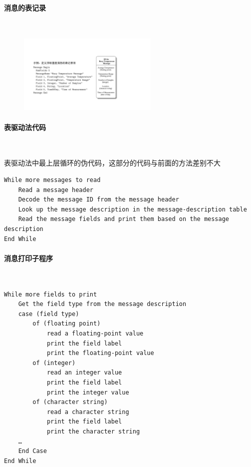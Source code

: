 \paragraph*{消息的表记录}~{} \par
\begin{figure}[H]
    \vspace{-0.5em}
	\centering
	\includegraphics[width=0.6\textwidth]{images/消息的表记录.pdf}
    \vspace{-1em}
\end{figure}

\paragraph*{表驱动法代码}~{} \par
表驱动法中最上层循环的伪代码，这部分的代码与前面的方法差别不大
\begin{lstlisting}
While more messages to read      
    Read a message header           
    Decode the message ID from the message header       
    Look up the message description in the message-description table
    Read the message fields and print them based on the message description
End While
\end{lstlisting}

\paragraph*{消息打印子程序}~{} \par
\begin{lstlisting}
While more fields to print
    Get the field type from the message description
    case (field type)
        of (floating point)
            read a floating-point value
            print the field label
            print the floating-point value
        of (integer)
            read an integer value
            print the field label
            print the integer value
        of (character string)
            read a character string
            print the field label
            print the character string
    …
    End Case
End While
\end{lstlisting}


